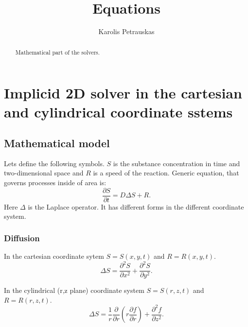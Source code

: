 \documentclass[a4paper,10pt]{article}
\title{Equations}
\author{Karolis Petrauskas}
\begin{document}
\maketitle
\begin{abstract}
    Mathematical part of the solvers.
\end{abstract}

\section{Implicid 2D solver in the cartesian and cylindrical coordinate sstems}
\subsection{Mathematical model}
Lets define the following symbols.
$S$ is the substance concentration in time and two-dimensional space and
$R$ is a speed of the reaction.
Generic equation, that governs processes inside of area is:
\begin{equation}\label{eq.im2d.governing}
    \frac{\partial S}{\partial t} = D \Delta S + R.
\end{equation}
Here $\Delta$ is the Laplace operator. It has different forms in the different coordinate system.

\subsubsection{Diffusion}

In the cartesian coordinate sytem $S = S(x, y, t)$ and $R = R(x, y, t)$.
\begin{equation}\label{eq.im2d.laplace.cartesian}
    \Delta S = \frac{\partial^2 S}{\partial x^2} + \frac{\partial^2 S}{\partial y^2}.
\end{equation}


In the cylindrical (r,z plane) coordinate system $S = S(r, z, t)$ and $R = R(r, z, t)$.
\begin{equation}\label{eq.im2d.laplace.cylindrical}
    \Delta S =
        \frac{1}{r} \frac{\partial}{\partial r}
        \left( r \frac{\partial f}{\partial r} \right) +
        \frac{\partial^2 f}{\partial z^2}.
\end{equation}
\end{document}
